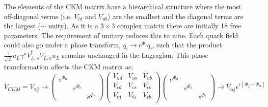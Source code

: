The elements of the CKM matrix have a hierarchical structure where the most off-diagonal terms (i.e. $V_{td}$ and $V_{ub}$) are the smallest and the diagonal terms are the largest ($\sim$ unity). As it is a $3\times3$ complex matrix there are initially 18 free parameters. The requirement of unitary reduces this to nine.
Each quark field could also go under a phase transform, $q_{i}\to e^{\Phi_{i}}q_{i}$, such that the product  $\frac{1}{\sqrt{2}}\overline{u}_{L}\gamma^{\mu}V^{\dagger}_{L,u}V_{L,u}u_{L}$ remains unchanged in the Lagragian. This phase transformation affects the CKM matrix as:
\begin{equation}
  V_{CKM} = V_{\alpha j} \to \begin{pmatrix}e^{\Phi_{u}}&&\\&e^{\Phi_{c}}&\\&&e^{\Phi_{t}}\end{pmatrix}\begin{pmatrix}V_{ud}&V_{us}&V_{ub}\\V_{cd}&V_{cs}&V_{cb}\\V_{td}&V_{ts}&V_{tb}\\\end{pmatrix} \begin{pmatrix}e^{\Phi_{d}}&&\\&e^{\Phi_{s}}&\\&&e^{\Phi_{b}}\end{pmatrix} \to V_{\alpha j}e^{i(\Phi_{j} - \Phi_{\alpha})}
\end{equation}

